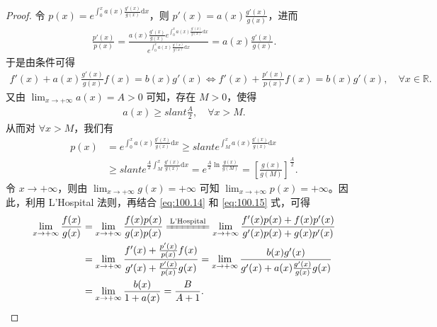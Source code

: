 \documentclass[../../main.tex]{subfiles}
\begin{document}
\begin{proof}
令 \(p(x) = e^{\int_0^x a(x) \frac{g'(x)}{g(x)} \mathrm{d}x}\)，则 \(p'(x) = a(x) \frac{g'(x)}{g(x)}\)，进而
\begin{align}
\frac{p'(x)}{p(x)} = \frac{a(x) \frac{g'(x)}{g(x)} e^{\int_0^x a(x) \frac{g'(x)}{g(x)} \mathrm{d}x}}{e^{\int_0^x a(x) \frac{g'(x)}{g(x)} \mathrm{d}x}} = a(x) \frac{g'(x)}{g(x)}. \label{eq:100.14}
\end{align}
于是由条件可得
\begin{align}
f'(x) + a(x) \frac{g'(x)}{g(x)} f(x) = b(x) g'(x) \Longleftrightarrow f'(x) + \frac{p'(x)}{p(x)} f(x) = b(x) g'(x), \quad \forall x \in \mathbb{R}. \label{eq:100.15}
\end{align}
又由 \(\lim_{x \to +\infty} a(x) = A > 0\) 可知，存在 \(M > 0\)，使得
\begin{align*}
a(x) \geqslant slant \frac{A}{2}, \quad \forall x > M.
\end{align*}
从而对 \(\forall x > M\)，我们有
\begin{align*}
p(x) &= e^{\int_0^x a(x) \frac{g'(x)}{g(x)} \mathrm{d}x} \geqslant slant e^{\int_M^x a(x) \frac{g'(x)}{g(x)} \mathrm{d}x} \\
&\geqslant slant e^{\frac{A}{2} \int_M^x \frac{g'(x)}{g(x)} \mathrm{d}x} = e^{\frac{A}{2} \ln \frac{g(x)}{g(M)}} = \left[ \frac{g(x)}{g(M)} \right]^{\frac{A}{2}}.
\end{align*}
令 \(x \to +\infty\)，则由 \(\lim_{x \to +\infty} g(x) = +\infty\) 可知 \(\lim_{x \to +\infty} p(x) = +\infty\)。因此，利用 L'Hospital 法则，再结合 \eqref{eq:100.14} 和 \eqref{eq:100.15} 式，可得
\begin{align*}
\lim_{x \to +\infty} \frac{f(x)}{g(x)} &= \lim_{x \to +\infty} \frac{f(x) p(x)}{g(x) p(x)} \xlongequal{\text{L'Hospital}} \lim_{x \to +\infty} \frac{f'(x) p(x) + f(x) p'(x)}{g'(x) p(x) + g(x) p'(x)} \\
&= \lim_{x \to +\infty} \frac{f'(x) + \frac{p'(x)}{p(x)} f(x)}{g'(x) + \frac{p'(x)}{p(x)} g(x)} = \lim_{x \to +\infty} \frac{b(x) g'(x)}{g'(x) + a(x) \frac{g'(x)}{g(x)} g(x)} \\
&= \lim_{x \to +\infty} \frac{b(x)}{1 + a(x)} = \frac{B}{A + 1}.
\end{align*}
\end{proof}
\end{document}
